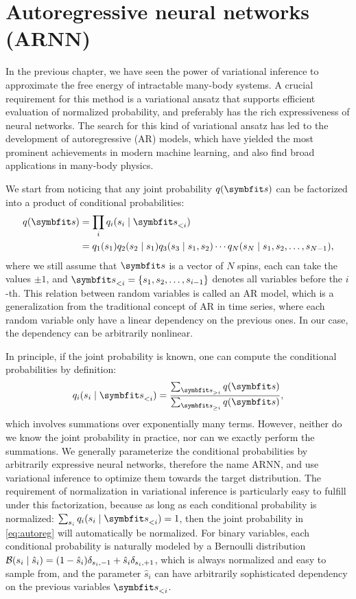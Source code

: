 \chapter{Autoregressive neural networks (ARNN)}
\label{sec:arnn}

In the previous chapter, we have seen the power of variational inference to approximate the free energy of intractable many-body systems. A crucial requirement for this method is a variational ansatz that supports efficient evaluation of normalized probability, and preferably has the rich expressiveness of neural networks. The search for this kind of variational ansatz has led to the development of autoregressive (AR) models, which have yielded the most prominent achievements in modern machine learning, and also find broad applications in many-body physics.

We start from noticing that any joint probability $q(\vs)$ can be factorized into a product of conditional probabilities:
\begin{align}
q(\vs) &= \prod_i q_i(s_i \mid \vs_{< i}) \label{eq:autoreg} \\
&= q_1(s_1) q_2(s_2 \mid s_1) q_3(s_3 \mid s_1, s_2) \cdots q_N(s_N \mid s_1, s_2, \ldots, s_{N - 1}),
\end{align}
where we still assume that $\vs$ is a vector of $N$ spins, each can take the values $\pm 1$, and $\vs_{< i} = \{s_1, s_2, \ldots, s_{i - 1}\}$ denotes all variables before the $i$-th. This relation between random variables is called an AR model, which is a generalization from the traditional concept of AR in time series, where each random variable only have a linear dependency on the previous ones. In our case, the dependency can be arbitrarily nonlinear.

In principle, if the joint probability is known, one can compute the conditional probabilities by definition:
\begin{equation}
q_i(s_i \mid \vs_{< i}) = \frac{\sum_{\vs_{> i}} q(\vs)}{\sum_{\vs_{\ge i}} q(\vs)},
\end{equation}
which involves summations over exponentially many terms. However, neither do we know the joint probability in practice, nor can we exactly perform the summations. We generally parameterize the conditional probabilities by arbitrarily expressive neural networks, therefore the name ARNN, and use variational inference to optimize them towards the target distribution. The requirement of normalization in variational inference is particularly easy to fulfill under this factorization, because as long as each conditional probability is normalized: $\sum_{s_i} q_i(s_i \mid \vs_{< i}) = 1$, then the joint probability in \cref{eq:autoreg} will automatically be normalized. For binary variables, each conditional probability is naturally modeled by a Bernoulli distribution $\mathcal{B}(s_i \mid \hat{s}_i) = (1 - \hat{s}_i) \delta_{s_i, -1} + \hat{s}_i \delta_{s_i, +1}$, which is always normalized and easy to sample from, and the parameter $\hat{s}_i$ can have arbitrarily sophisticated dependency on the previous variables $\vs_{< i}$.


